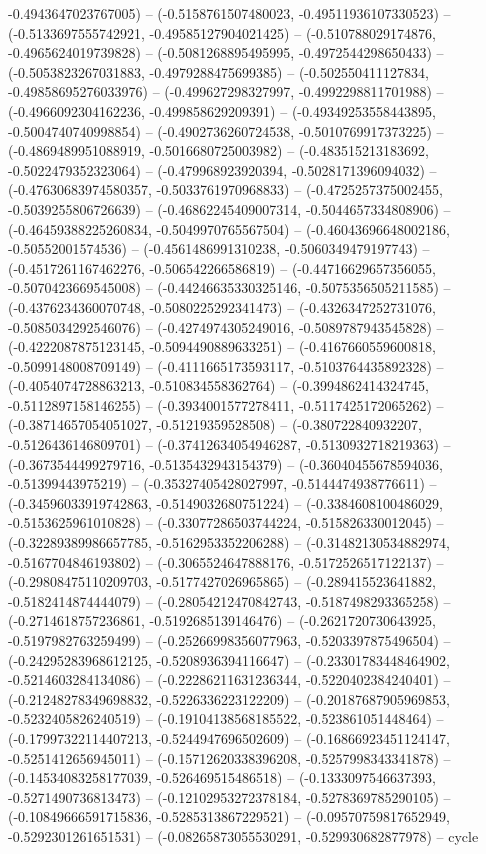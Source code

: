 -0.4943647023767005) -- (-0.5158761507480023, -0.49511936107330523) -- (-0.5133697555742921, -0.49585127904021425) -- (-0.510788029174876, -0.4965624019739828) -- (-0.5081268895495995, -0.4972544298650433) -- (-0.5053823267031883, -0.4979288475699385) -- (-0.502550411127834, -0.49858695276033976) -- (-0.499627298327997, -0.4992298811701988) -- (-0.4966092304162236, -0.499858629209391) -- (-0.49349253558443895, -0.5004740740998854) -- (-0.4902736260724538, -0.5010769917373225) -- (-0.4869489951088919, -0.5016680725003982) -- (-0.483515213183692, -0.5022479352323064) -- (-0.479968923920394, -0.5028171396094032) -- (-0.47630683974580357, -0.5033761970968833) -- (-0.4725257375002455, -0.5039255806726639) -- (-0.46862245409007314, -0.5044657334808906) -- (-0.46459388225260834, -0.5049970765567504) -- (-0.46043696648002186, -0.50552001574536) -- (-0.4561486991310238, -0.5060349479197743) -- (-0.4517261167462276, -0.506542266586819) -- (-0.44716629657356055, -0.5070423669545008) -- (-0.44246635330325146, -0.5075356505211585) -- (-0.4376234360070748, -0.5080225292341473) -- (-0.4326347252731076, -0.5085034292546076) -- (-0.4274974305249016, -0.5089787943545828) -- (-0.4222087875123145, -0.5094490889633251) -- (-0.4167660559600818, -0.5099148008709149) -- (-0.4111665173593117, -0.5103764435892328) -- (-0.4054074728863213, -0.510834558362764) -- (-0.3994862414324745, -0.5112897158146255) -- (-0.3934001577278411, -0.5117425172065262) -- (-0.38714657054051027, -0.51219359528508) -- (-0.380722840932207, -0.5126436146809701) -- (-0.37412634054946287, -0.5130932718219363) -- (-0.3673544499279716, -0.5135432943154379) -- (-0.36040455678594036, -0.51399443975219) -- (-0.35327405428027997, -0.5144474938776611) -- (-0.34596033919742863, -0.5149032680751224) -- (-0.3384608100486029, -0.5153625961010828) -- (-0.33077286503744224, -0.515826330012045) -- (-0.32289389986657785, -0.5162953352206288) -- (-0.31482130534882974, -0.5167704846193802) -- (-0.3065524647888176, -0.5172526517122137) -- (-0.29808475110209703, -0.5177427026965865) -- (-0.289415523641882, -0.5182414874444079) -- (-0.28054212470842743, -0.5187498293365258) -- (-0.2714618757236861, -0.5192685139146476) -- (-0.2621720730643925, -0.5197982763259499) -- (-0.25266998356077963, -0.5203397875496504) -- (-0.24295283968612125, -0.5208936394116647) -- (-0.23301783448464902, -0.5214603284134086) -- (-0.22286211631236344, -0.5220402384240401) -- (-0.21248278349698832, -0.5226336223122209) -- (-0.20187687905969853, -0.5232405826240519) -- (-0.19104138568185522, -0.523861051448464) -- (-0.17997322114407213, -0.5244947696502609) -- (-0.16866923451124147, -0.5251412656945011) -- (-0.15712620338396208, -0.5257998343341878) -- (-0.14534083258177039, -0.526469515486518) -- (-0.1333097546637393, -0.5271490736813473) -- (-0.12102953272378184, -0.5278369785290105) -- (-0.10849666591715836, -0.5285313867229521) -- (-0.09570759817652949, -0.5292301261651531) -- (-0.08265873055530291, -0.529930682877978) -- cycle
